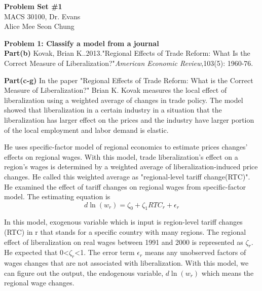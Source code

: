 \documentclass[letterpaper,12pt]{article}
\theoremstyle{definition}
\begin{document}
\begin{flushleft}
  \textbf{\large{Problem Set \#1}} \\
  MACS 30100, Dr. Evans \\
  Alice Mee Seon Chung
\end{flushleft}

\vspace{2mm}

\noindent\textbf{Problem 1: Classify a model from a journal}
 \\
 
\textbf{Part(b)} Kovak, Brian K..2013.{"}Regional Effects of Trade Reform: What Is the Correct Measure of Liberalization?{"}\textit {American Economic Review},103(5): 1960-76.
  
\par\textbf{Part(c-g)}
 In the paper { "Regional Effects of Trade Reform: What is the Correct Measure of Liberalization?"} Brian K. Kovak measures the local effect of liberalization using a weighted average of changes in trade policy. The model showed that liberalization in a certain industry in a situation that the liberalization has larger effect on the prices and the industry have larger portion of the local employment and labor demand is elastic.
 \par
He uses specific-factor model of regional economics to estimate prices changes{'} effects on regional wages. With this model, trade liberalization{'}s effect on a region{'}s wages is determined by a weighted average of liberalization-induced price changes. He called this weighted average as {"regional-level tariff change(RTC)"}. He examined the effect of tariff changes on regional wages from specific-factor model. The estimating equation is
\begin{equation} \label{eu_eqn}
\textit{d}\ln\left ( w_{r} \right ) = \zeta _{0} + \zeta _{1}RTC_{r} + \epsilon _{r}
\end{equation}
 \par
 In this model, exogenous variable which is input is region-level tariff changes (RTC) in r that stands for a specific country with many regions. The regional effect of liberalization on real wages between 1991 and 2000 is represented as $\zeta_{r}$. He expected that 0<$\zeta_{r}$<1. The error term $\epsilon_{r}$ means any unobserved factors of wages changes that are not associated with liberalization. With this model, we can figure out the output, the endogenous variable, $\textit{d}\ln( w_{r})$ which means the regional wage changes. 
\end{document}
